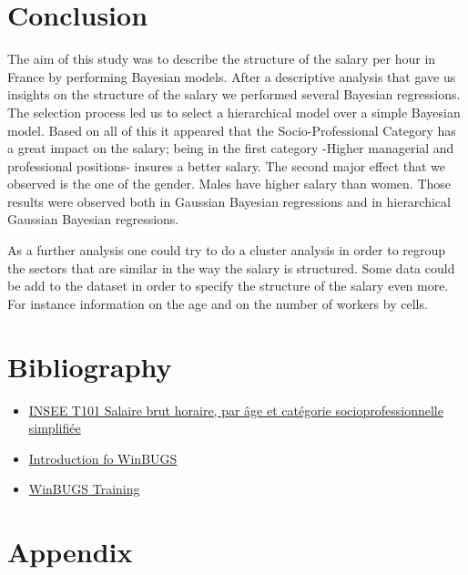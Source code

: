 \documentclass[]{article}
\begin{document}
\newpage

\section{Conclusion}\label{conclusion}

The aim of this study was to describe the structure of the salary per
hour in France by performing Bayesian models. After a descriptive
analysis that gave us insights on the structure of the salary we
performed several Bayesian regressions. The selection process led us to
select a hierarchical model over a simple Bayesian model. Based on all
of this it appeared that the Socio-Professional Category has a great
impact on the salary; being in the first category -Higher managerial and
professional positions- insures a better salary. The second major effect
that we observed is the one of the gender. Males have higher salary than
women. Those results were observed both in Gaussian Bayesian regressions
and in hierarchical Gaussian Bayesian regressions.

As a further analysis one could try to do a cluster analysis in order to
regroup the sectors that are similar in the way the salary is
structured. Some data could be add to the dataset in order to specify
the structure of the salary even more. For instance information on the
age and on the number of workers by cells.

\vspace{3cm}

\section{Bibliography}\label{bibliography}

\begin{itemize}
\itemsep1pt\parskip0pt
\item
  \href{http://www.insee.fr/fr/themes/detail.asp?reg_id=0\&ref_id=ir-irsocdads2011\&page=irweb/irsocdads2011/dd/irsocdads2011_t10.htm}{INSEE
  T101 Salaire brut horaire, par âge et catégorie socioprofessionnelle
  simplifiée}
\item
  \href{http://homepage.stat.uiowa.edu/~gwoodwor/BBIText/AppendixBWinbugs.pdf}{Introduction
  fo WinBUGS}
\item
  \href{https://www.uclouvain.be/cps/ucl/doc/stat/documents/WinBUGSTraining_smcs.pdf}{WinBUGS
  Training}
\end{itemize}

\newpage

\section{Appendix}\label{appendix}
\end{document}
